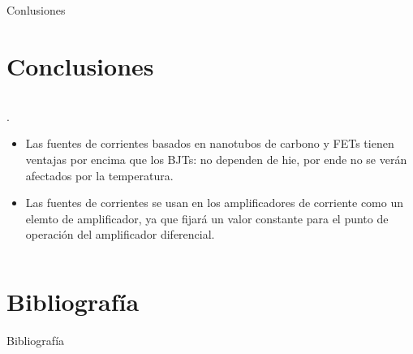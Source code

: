 \documentclass[aspectratio=169, 8pt]{beamer}
\begin{document}
\begin{frame}{Conlusiones}
	\section{Conclusiones}
	
	\begin{columns}
		\begin{column}{0.8\textwidth}
			\begin{block}{.}
				\begin{itemize}
					\item Las fuentes de corrientes   basados en nanotubos de carbono y FETs tienen ventajas por encima que los BJTs: no dependen de hie, por ende no se verán afectados por la temperatura.
					\item Las fuentes de corrientes se usan en los amplificadores de corriente como un elemto de amplificador, ya que fijará un valor constante para el punto de operación del amplificador diferencial.
				\end{itemize}
			\end{block}
		\end{column}
	\end{columns}
\end{frame}


\section{Bibliografía}
\begin{frame}{Bibliografía}
	\small
	
	
\end{frame}


	
\end{document}
